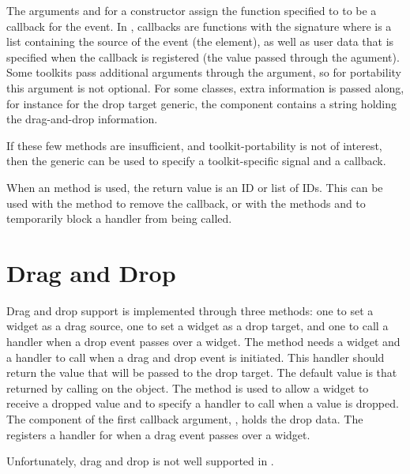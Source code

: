 The arguments  and  for a constructor
assign the function specified to  to be a callback for
the  event. In , callbacks are
functions with the signature  where  is a list
containing the source of the event (the  element), as well
as user data that is specified when the callback is registered (the
value passed through the  agument). Some toolkits pass
additional arguments through the  argument, so for
portability this argument is not optional. For some classes, extra
information is passed along, for instance for the drop target generic,
the component  contains a string holding the
drag-and-drop information.

If these few methods are insufficient, and toolkit-portability is not
of interest, then the  generic can be used to specify
a toolkit-specific signal and a callback.

When an  method is used, the return value is an
ID or list of IDs. This can be used with the method  to remove
the callback, or with the methods  and
 to temporarily block a handler from being
called.


\section{Drag and Drop}
\label{sec:drag-drop}

Drag and drop support is implemented through three methods: one to set
a widget as a drag source, one to set a widget as a drop target, and
one to call a handler when a drop event passes over a widget. The
 method needs a widget and a handler to call
when a drag and drop event is initiated. This handler should return
the value that will be passed to the drop target. The default value is
that returned by calling  on the object. The
 method is used to allow a widget to receive a
dropped value and to specify a handler to call when a value is
dropped. The  component of the first callback argument,
, holds the drop data. The  registers a
handler for when a drag event passes over a widget.

Unfortunately, drag and drop  is not well supported in .

